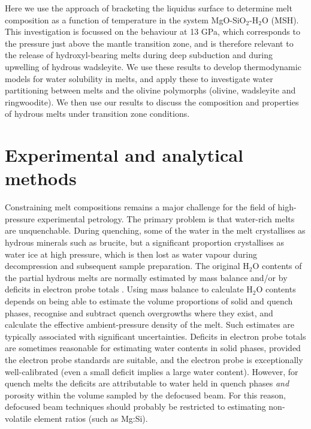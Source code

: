 \documentclass[review]{elsarticle}
\begin{document}
Here we use the approach of bracketing the liquidus surface to determine melt composition as a function of temperature in the system MgO-SiO$_2$-H$_2$O (MSH). This investigation is focussed on the behaviour at 13 GPa, which corresponds to the pressure just above the mantle transition zone, and is therefore relevant to the release of hydroxyl-bearing melts during deep subduction and during upwelling of hydrous wadsleyite. We use these results to develop thermodynamic models for water solubility in melts, and apply these to investigate water partitioning between melts and the olivine polymorphs (olivine, wadsleyite and ringwoodite). We then use our results to discuss the composition and properties of hydrous melts under transition zone conditions.

\section{Experimental and analytical methods}
Constraining melt compositions remains a major challenge for the field of high-pressure experimental petrology. The primary problem is that water-rich melts are unquenchable. During quenching, some of the water in the melt crystallises as hydrous minerals such as brucite, but a significant proportion crystallises as water ice at high pressure, which is then lost as water vapour during decompression and subsequent sample preparation. The original H$_2$O contents of the partial hydrous melts are normally estimated by mass balance and/or by deficits in electron probe totals \citep[e.g.][]{OMY2000, DDFK2005, LSOK2011, MSUP2007}. Using mass balance to calculate H$_2$O contents depends on being able to estimate the volume proportions of solid and quench phases, recognise and subtract quench overgrowths where they exist, and calculate the effective ambient-pressure density of the melt. Such estimates are typically associated with significant uncertainties. Deficits in electron probe totals are sometimes reasonable for estimating water contents in solid phases, provided the electron probe standards are suitable, and the electron probe is exceptionally well-calibrated (even a small deficit implies a large water content). However, for quench melts the deficits are attributable to water held in quench phases \emph{and} porosity within the volume sampled by the defocused beam. For this reason, defocused beam techniques should probably be restricted to estimating non-volatile element ratios (such as Mg:Si).
\end{document}
